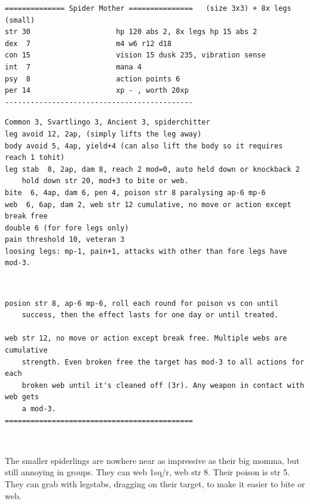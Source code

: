 \small \begin{samepage} \begin{verbatim}
============== Spider Mother ===============   (size 3x3) + 8x legs (small)
str 30                    hp 120 abs 2, 8x legs hp 15 abs 2
dex  7                    m4 w6 r12 d18
con 15                    vision 15 dusk 235, vibration sense
int  7                    mana 4
psy  8                    action points 6
per 14                    xp - , worth 20xp
--------------------------------------------
\end{verbatim} \end{samepage} \goodbreak \begin{samepage} \begin{verbatim}
Common 3, Svartlingo 3, Ancient 3, spiderchitter
leg avoid 12, 2ap, (simply lifts the leg away)
body avoid 5, 4ap, yield+4 (can also lift the body so it requires reach 1 tohit)
leg stab  8, 2ap, dam 8, reach 2 mod=0, auto held down or knockback 2
    hold down str 20, mod+3 to bite or web.
bite  6, 4ap, dam 6, pen 4, poison str 8 paralysing ap-6 mp-6
web  6, 6ap, dam 2, web str 12 cumulative, no move or action except break free
double 6 (for fore legs only)
pain threshold 10, veteran 3
loosing legs: mp-1, pain+1, attacks with other than fore legs have mod-3.
\end{verbatim} \end{samepage}   \   \goodbreak \begin{samepage} \begin{verbatim}
posion str 8, ap-6 mp-6, roll each round for poison vs con until
    success, then the effect lasts for one day or until treated.

web str 12, no move or action except break free. Multiple webs are cumulative
    strength. Even broken free the target has mod-3 to all actions for each
    broken web until it's cleaned off (3r). Any weapon in contact with web gets
    a mod-3.
============================================
\end{verbatim} \end{samepage} \normalsize

\

\goodbreak 
\noindent The smaller spiderlings are nowhere near as impressive as their big momma, but still annoying in groups. They can web 1sq/r, web str 8. Their poison is str 5. They can grab with legstabs, dragging on their target, to make it easier to bite or web.

\

